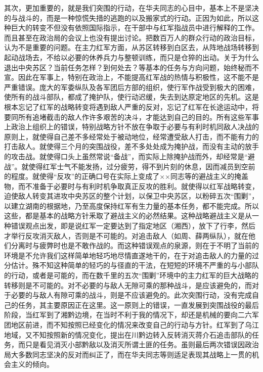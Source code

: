 其次，更加重要的，就是我们突围的行动，在华夫同志的心目中，基本上不是坚决的与战斗的，而是一种惊慌失措的逃跑的以及搬家式的行动。正因为如此，所以这种巨大的转变不但没有依照国际指示，在干部中与红军指战员中进行解释的工作。而且甚至在政治局的会议上也没有提出讨论。把数百万人的群众行动的政治目标，认为不是重要的问题。在主力红军方面，从苏区转移到白区去，从阵地战场转移到起动战场去，不给以必要的休养兵力与整顿训练，而只是仓猝的出动。关于为什么退出中央苏区？当前任务怎样？到何处去？等基本的任务与方向问题，始终秘而不宣。因此在军事上，特别在政治上，不能提高红军战的热情与积极性，这不能不是严重错误。庞大的军委纵队及各军团后方部的组织，使行军作战受到极大的困难，使所有的战斗部队，都成了掩护队，使行动迟缓，失去到达原定地区的先机。这是根本忘记了红军的战略转变将遇到敌人严重的反对，忘记了红军在长途运动中，将要同所有追堵截击的敌人作许多艰苦的决斗，才能达到自己的目的。所有这些军事上政治上组织上的错误，特别战略方针不放在争取于必要与有利时机同敌人决战的原则上，就使得自己差不多经常处于被动地位，经常遭受敌人打击，而不能有力的打击敌人。就使得三个月的突围战役，差不多处处成为掩护战，而没有主动的放手的攻击战。就使得口头上虽然常说“备战”，而实际上除掩护战而外，却经常是“避战”。就使得红军士气不能发扬，过分疲劳，得不到片刻的休息，因而减员到空前的程度。就使得“反攻”的正确口号在实际上变成了××同志等的避战主义的掩盖物，而不准备于必要时与有利时机争取真正反攻的胜利。就使得以红军战略转变，迫使敌人转变其进攻中央苏区的整个计划，以保卫中央苏区，以粉碎五次“围剿”，以建立湖南的根据地，乃至高度保持红军有生力量的基本任务，都不能完成。所以这些，都是基本的战略方针釆取了避战主义的必然结果。这种战略避战主义是从一种错误观点出发，即是说红军一定要达到了指定地区（湘西），放下了行李，然后才举行反攻消灭敌人，否则是不可能的。对追击敌人（如周、薛两纵队），就在他们分离时与疲弊时也是不敢作战的。而这种错误观点的泉源，则在于不明了当前的环境是不允许我们这样简单地轻巧地尽情直遂地干的，在于对追击敌人的力量的过分估计。殊不知这种简单的轻巧的与径直的干法，在短短的环境不严重的与小部队的行动，或者是可能的，而在数千里的五次“围剿”环境中的主力红军的巨大战略的转移则是不可能的。对不必要的与敌人无隙可乘的那种战斗，是应该避免的，而对于必要的与敌人有隙可乘的战斗，则是不应该避免的。此次突围行动，没有完成自己的任务，其主要原因正在这里。这一原则上的错误，一直发展到突围战役的最后阶段，当红军到了湘黔边境，在当时不利于我的情况下，却还是机械的要向二六军团地区前进，而不知按照已经变化的情况来改变自己的行动与方针。红军到了乌江地域，又不知按照新的情况变化，提出在川黔边转入反转消灭蒋介石追击部队的任务，而只是看见消灭小部黔敌以及消灭所谓土匪的任务。虽则最后两次错误因政治局大多数同志坚决的反对而纠正了，而在华夫同志等则适足表现其战略上一贯的机会主义的倾向。

